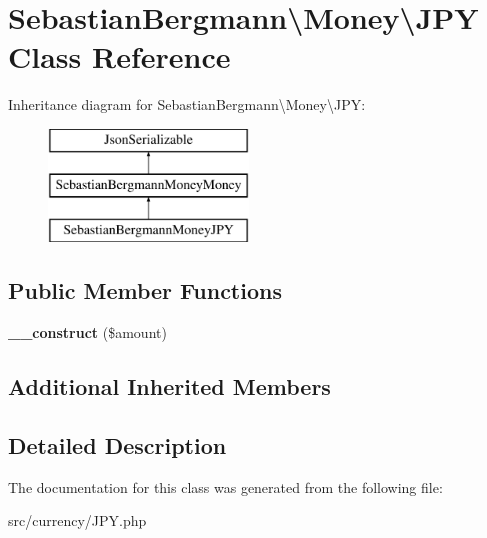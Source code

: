 \hypertarget{classSebastianBergmann_1_1Money_1_1JPY}{}\section{Sebastian\+Bergmann\textbackslash{}Money\textbackslash{}J\+P\+Y Class Reference}
\label{classSebastianBergmann_1_1Money_1_1JPY}
Inheritance diagram for Sebastian\+Bergmann\textbackslash{}Money\textbackslash{}J\+P\+Y\+:\begin{figure}[H]
\begin{center}
\leavevmode
\includegraphics[height=3.000000cm]{classSebastianBergmann_1_1Money_1_1JPY}
\end{center}
\end{figure}
\subsection*{Public Member Functions}
\begin{DoxyCompactItemize}
\item 
\hypertarget{classSebastianBergmann_1_1Money_1_1JPY_ac0c47e8a6c99bac3bd1ec81381e18e13}{}{\bfseries \+\_\+\+\_\+construct} (\$amount)\label{classSebastianBergmann_1_1Money_1_1JPY_ac0c47e8a6c99bac3bd1ec81381e18e13}

\end{DoxyCompactItemize}
\subsection*{Additional Inherited Members}


\subsection{Detailed Description}


The documentation for this class was generated from the following file\+:\begin{DoxyCompactItemize}
\item 
src/currency/J\+P\+Y.\+php\end{DoxyCompactItemize}

